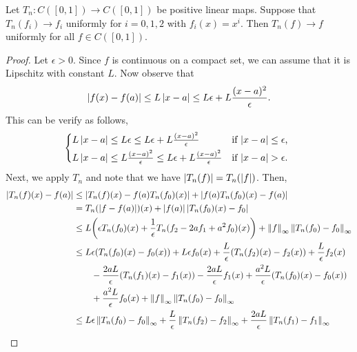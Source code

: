 \begin{theorem}[Korovkin]
    Let $T_n:C([0,1])\to C([0,1])$ be positive linear maps. Suppose that 
    $T_n(f_i)\to f_i$ uniformly for $i = 0,1,2$ with $f_i(x) = x^i$. Then 
    $T_n(f)\to f$ uniformly for all $f\in C([0,1])$.
\end{theorem}
\begin{proof}
    Let $\epsilon > 0$. Since $f$ is continuous on a compact 
    set, we can assume that it is Lipschitz with constant $L$. Now observe 
    that 
    \begin{equation*}
        \left\lvert {f(x)-f(a)} \right\rvert \leq L\left\lvert {x-a} \right\rvert \leq L\epsilon + L\frac{(x-a)^2}{\epsilon}.
    \end{equation*}
    This can be verify as follows, 
    \begin{equation*}
        \begin{cases*}
            L\abs{x-a} \leq L\epsilon \leq L\epsilon + L\frac{(x-a)^2}{\epsilon}  & if $\abs{x-a} \leq \epsilon$, \\
            L\abs{x-a} \leq L\frac{(x-a)^2}{\epsilon} \leq L\epsilon + L\frac{(x-a)^2}{\epsilon} & if $\abs{x-a} > \epsilon$.
        \end{cases*}
    \end{equation*}
    Next, we apply $T_n$ and note that we have $\left\lvert {T_n(f)} \right\rvert = T_n(\left\lvert {f} \right\rvert)$. 
    Then,
    \begin{equation*}
        \begin{split}
            \abs{T_n(f)(x) - f(a)} &\leq \abs{T_n(f)(x) - f(a)T_n(f_0)(x)} + \abs{f(a)T_n(f_0)(x) - f(a)} \\ 
            &= T_n(\abs{f-f(a)})(x) + \abs{f(a)}\abs{T_n(f_0)(x) - f_0} \\
            &\leq L\pth{\epsilon T_n(f_0)(x) + \frac{1}{\epsilon}T_n(f_2 - 2af_1 + a^2f_0)(x)} + \norm{f}_\infty\norm{T_n(f_0) - f_0}_\infty \\
            &\leq L\epsilon(T_n(f_0)(x) - f_0(x)) + L\epsilon f_0(x) + \frac{L}{\epsilon}(T_n(f_2)(x) - f_2(x)) + \frac{L}{\epsilon}f_2(x) \\
            &\qquad - \frac{2aL}{\epsilon}(T_n(f_1)(x) - f_1(x)) - \frac{2aL}{\epsilon}f_1(x) + \frac{a^2L}{\epsilon}(T_n(f_0)(x) - f_0(x)) \\
            &\qquad + \frac{a^2L}{\epsilon}f_0(x) + \norm{f}_\infty\norm{T_n(f_0) - f_0}_\infty \\
            &\leq L\epsilon\norm{T_n(f_0) - f_0}_\infty + \frac{L}{\epsilon}\norm{T_n(f_2) - f_2}_\infty + \frac{2aL}{\epsilon}\norm{T_n(f_1) - f_1}_\infty \\

\end{split}
\end{equation*}
\end{proof}
